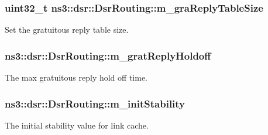 \subsubsection[{\texorpdfstring{m\+\_\+gra\+Reply\+Table\+Size}{m_graReplyTableSize}}]{\setlength{\rightskip}{0pt plus 5cm}uint32\+\_\+t ns3\+::dsr\+::\+Dsr\+Routing\+::m\+\_\+gra\+Reply\+Table\+Size\hspace{0.3cm}{\ttfamily [private]}}\hypertarget{classns3_1_1dsr_1_1DsrRouting_aa22d7408adbcefde51113d45b83d415f}{}\label{classns3_1_1dsr_1_1DsrRouting_aa22d7408adbcefde51113d45b83d415f}


Set the gratuitous reply table size. 

\subsubsection[{\texorpdfstring{m\+\_\+grat\+Reply\+Holdoff}{m_gratReplyHoldoff}}]{ ns3\+::dsr\+::\+Dsr\+Routing\+::m\+\_\+grat\+Reply\+Holdoff\hspace{0.3cm}{\ttfamily [private]}}\hypertarget{classns3_1_1dsr_1_1DsrRouting_a43f5d8b4569f2122788518584ce3ae77}{}\label{classns3_1_1dsr_1_1DsrRouting_a43f5d8b4569f2122788518584ce3ae77}


The max gratuitous reply hold off time. 

\subsubsection[{\texorpdfstring{m\+\_\+init\+Stability}{m_initStability}}]{ ns3\+::dsr\+::\+Dsr\+Routing\+::m\+\_\+init\+Stability\hspace{0.3cm}{\ttfamily [private]}}\hypertarget{classns3_1_1dsr_1_1DsrRouting_a9b68bafde23cf10e425d341f91da3b5e}{}\label{classns3_1_1dsr_1_1DsrRouting_a9b68bafde23cf10e425d341f91da3b5e}


The initial stability value for link cache. 


